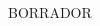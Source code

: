 \thispagestyle{empty}
\begin{titlepage}
    \vspace*{\fill}
    \begin{center}
        {\crest} \\[1.3cm]
        {\Large \gradua}\\
        {\espezialitatea}\\[1.5cm]
        
        {\large {\gapizenburua}}\\[0.2cm]
        \HRule \\[0.5cm]
        
        { \LARGE 
        \begin{spacing}{1}
        \textbf{\izenburua}
        \end{spacing}
        }
        \vspace{0.5cm}
        \HRule \\[2.0cm]
        
        { \egileatestua\\}
        {\Large \textsl{\egilea}\\}
        \vspace{2.0cm} 
        { \zuzendariaktestua\\}
        {\zuzendariak}
        \begin{tcolorbox}[breakable]
            BORRADOR
        \end{tcolorbox}
    \end{center}
    \vspace*{\fill}
\end{titlepage}
\restoregeometry %
\cleardoublepage

